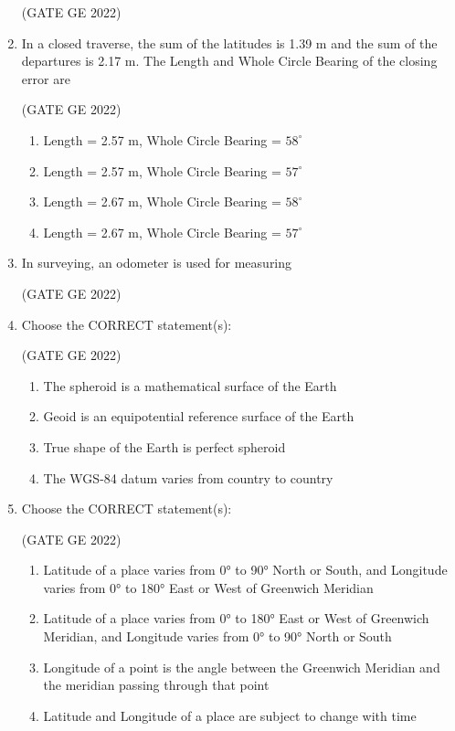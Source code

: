 \documentclass[journal,12pt,onecolumn]{IEEEtran}
\theoremstyle{remark}
\begin{document}
\begin{enumerate}
\hfill (GATE GE 2022)

\item In a closed traverse, the sum of the latitudes is 1.39 m and the sum of the departures is 2.17 m. The Length and Whole Circle Bearing of the closing error are

\hfill (GATE GE 2022)

\begin{enumerate}
    \item Length = 2.57 m, Whole Circle Bearing = $58^\circ$
    \item Length = 2.57 m, Whole Circle Bearing = $57^\circ$
    \item Length = 2.67 m, Whole Circle Bearing = $58^\circ$
    \item Length = 2.67 m, Whole Circle Bearing = $57^\circ$
\end{enumerate}

\item In surveying, an odometer is used for measuring

\hfill (GATE GE 2022)

\begin{enumerate}
\end{enumerate}

\item Choose the CORRECT statement(s):

\hfill (GATE GE 2022)

\begin{enumerate}
    \item The spheroid is a mathematical surface of the Earth
    \item Geoid is an equipotential reference surface of the Earth
    \item True shape of the Earth is perfect spheroid
    \item The WGS-84 datum varies from country to country
\end{enumerate}

\item Choose the CORRECT statement(s):

\hfill (GATE GE 2022)

\begin{enumerate}
    \item Latitude of a place varies from 0° to 90° North or South, and Longitude varies from 0° to 180° East or West of Greenwich Meridian
    \item Latitude of a place varies from 0° to 180° East or West of Greenwich Meridian, and Longitude varies from 0° to 90° North or South
    \item Longitude of a point is the angle between the Greenwich Meridian and the meridian passing through that point
    \item Latitude and Longitude of a place are subject to change with time
\end{enumerate}


\end{enumerate}
\end{document}
